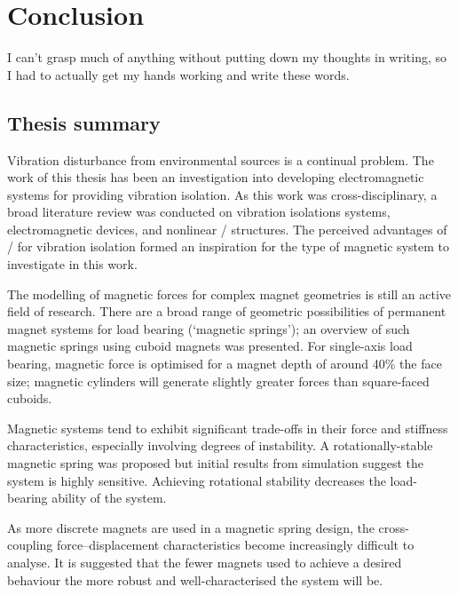 \documentclass[10pt,a4paper]{memoir}
\begin{document}
\chapter{Conclusion}

\epigraph{
  I can't grasp much of anything without putting down my thoughts in writing, so I had to actually get my hands working and write these words.
}{\textcite{murakami2008}}

\section{Thesis summary}

Vibration disturbance from environmental sources is a continual problem.
The work of this thesis has been an investigation into developing electromagnetic systems for providing vibration isolation.
As this work was cross-disciplinary, a broad literature review was conducted on vibration isolations systems, electromagnetic devices, and nonlinear \qzs/ structures.
The perceived advantages of \qzs/ for vibration isolation formed an inspiration for the type of magnetic system to investigate in this work.

The modelling of magnetic forces for complex magnet geometries is still an active field of research.
There are a broad range of geometric possibilities of permanent magnet systems for load bearing (`magnetic springs'); an overview of such magnetic springs using cuboid magnets was presented.
For single-axis load bearing, magnetic force is optimised for a magnet depth of around 40\% the face size; magnetic cylinders will generate slightly greater forces than square-faced cuboids.

Magnetic systems tend to exhibit significant trade-offs in their force and stiffness characteristics, especially involving degrees of instability.
A rotationally-stable magnetic spring was proposed but initial results from simulation suggest the system is highly sensitive.
Achieving rotational stability decreases the load-bearing ability of the system.

As more discrete magnets are used in a magnetic spring design, the cross-coupling force--displacement characteristics become increasingly difficult to analyse.
It is suggested that the fewer magnets used to achieve a desired behaviour the more robust and well-characterised the system will be.
\end{document}
